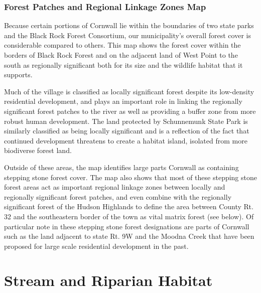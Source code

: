 \subsection*{Forest Patches and Regional Linkage Zones Map}\label{subsec:forestpatchesandreglinkagezonesmap}
Because certain portions of Cornwall lie within the boundaries of two state
parks and the Black Rock Forest Consortium, our municipality’s overall forest
cover is considerable compared to others. This map shows the forest cover
within the borders of Black Rock Forest and on the adjacent land of West Point
to the south as regionally significant both for its size and the wildlife
habitat that it supports.
\par
Much of the village is classified as locally significant forest despite its
low-density residential development, and plays an important role in linking the
regionally significant forest patches to the river as well as providing a
buffer zone from more robust human development. The land protected by
Schunnemunk State Park is similarly classified as being locally significant and
is a reflection of the fact that continued development threatens to create a
habitat island, isolated from more biodiverse forest land.
\par
Outside of these areas, the map identifies large parts Cornwall as containing
stepping stone forest cover. The map also shows that most of these stepping
stone forest areas act as important regional linkage zones between locally and
regionally significant forest patches, and even combine with the regionally
significant forest of the Hudson Highlands to define the area between County
Rt. 32 and the southeastern border of the town as vital matrix forest (see
below). Of particular note in these stepping stone forest designations are
parts of Cornwall such as the land adjacent to state Rt. 9W and the Moodna
Creek that have been proposed for large scale residential development in the
past.
\label{map:forestpatches}

\chapter{Stream and Riparian Habitat}\label{subsec:streamandriparianhabitat}
